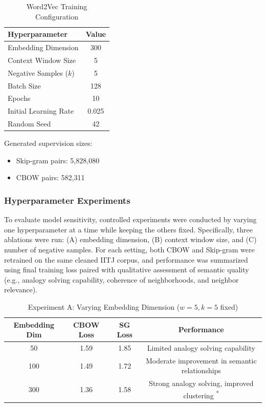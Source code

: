 \documentclass[11pt,a4paper]{article}
\begin{document}
\begin{table}[H]
\centering
\caption{Word2Vec Training Configuration}
\small
\begin{tabular}{l c}
\toprule
\textbf{Hyperparameter} & \textbf{Value} \\
\midrule
Embedding Dimension & 300 \\
Context Window Size & 5 \\
Negative Samples ($k$) & 5 \\
Batch Size & 128 \\
Epochs & 10 \\
Initial Learning Rate & 0.025  \\
Random Seed & 42 \\
\bottomrule
\end{tabular}
\end{table}

Generated supervision sizes:
\begin{itemize}[leftmargin=1.5em]
    \item Skip-gram pairs: 5,828,080
    \item CBOW pairs: 582,311
\end{itemize}

\subsubsection{Hyperparameter Experiments }

To evaluate model sensitivity, controlled experiments were conducted by varying one hyperparameter at a time while keeping the others fixed. Specifically, three ablations were run: (A) embedding dimension, (B) context window size, and (C) number of negative samples. For each setting, both CBOW and Skip-gram were retrained on the same cleaned IITJ corpus, and performance was summarized using final training loss paired with qualitative assessment of semantic quality (e.g., analogy solving capability, coherence of neighborhoods, and neighbor relevance).


\begin{table}[H]
\centering
\caption{Experiment A: Varying Embedding Dimension ($w=5, k=5$ fixed)}
\small
\begin{tabular}{c c c c}
\toprule
\textbf{Embedding Dim} & \textbf{CBOW Loss} & \textbf{SG Loss} & \textbf{Performance} \\
\midrule
50  & 1.59 & 1.85 & Limited analogy solving capability \\
100 & 1.49 & 1.72 & Moderate improvement in semantic relationships \\
300 & 1.36 & 1.58 & Strong analogy solving, improved clustering \textsuperscript{*} \\
\bottomrule
\end{tabular}
\end{table}
\end{document}
